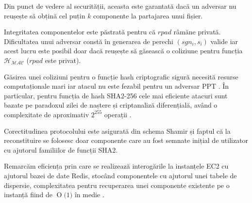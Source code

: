 \documentclass[oneside, 12pt]{book}
\newcommand{\BigO}[1]{\ensuremath{\operatorname{O}\bigl(#1\bigr)}}
\begin{document}
Din punct de vedere al securității, aceasta este garantată dacă un adversar nu reușește să obțină cel puțin $k$ componente la partajarea unui fișier.

Integritatea componentelor este păstrată pentru că $rpad$ râmăne privată. Dificultatea unui adversar constă în generarea de perechi $(sgn_i, s_i)$ valide iar acest lucru este posibil doar dacă reușește să găsească o coliziune pentru funcția $\mathcal{H_{MAC}}$ ($rpad$ este privat).

Găsirea unei coliziuni pentru o funcție hash criptografic sigură necesită resurse computaționale mari iar atacul nu este fezabil pentru un adversar PPT \cite{Katz:2007}. În particular, pentru funcția de hash SHA2-256 cele mai eficiente atacuri sunt bazate pe paradoxul zilei de naștere și criptanaliză diferențială, având o complexitate de aproximativ $2^{255}$ operații \cite{khovratovich2012bicliques}.

Corectitudinea protocolului este asigurată din schema Shamir și faptul că la reconstituire se folosesc doar componente care au fost semnate inițial de utilizator cu ajutorul familiilor de funcții SHA2.

Remarcăm eficiența prin care se realizează interogările la instanțele EC2 cu ajutorul bazei de date Redis, stocând componentele cu ajutorul unei tabele de dispersie, complexitatea pentru recuperarea unei componente existente pe o instanță fiind de \BigO{1} în medie \cite{cormen:2009introduction}.




\end{document}
